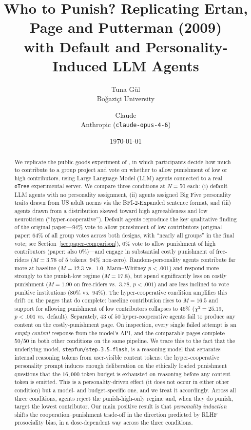 \documentclass[12pt, a4paper]{article}
\title{Who to Punish? Replicating Ertan, Page and Putterman (2009) \\ with Default and Personality-Induced LLM Agents}
\author{
  Tuna G\"ul\\
  Bo\u{g}azi\c{c}i University
  \and
  Claude\\
  Anthropic (\texttt{claude-opus-4-6})
}
\date{\today}
\begin{document}
\maketitle

\begin{abstract}
We replicate the public goods experiment of \citet{ertan2009who}, in which participants decide how much to contribute to a group project and vote on whether to allow punishment of low or high contributors, using Large Language Model (LLM) agents connected to a real \texttt{oTree} experimental server. We compare three conditions at $N=50$ each: (i) default LLM agents with no personality assignment, (ii) agents assigned Big Five personality traits drawn from US adult norms via the BFI-2-Expanded sentence format, and (iii) agents drawn from a distribution skewed toward high agreeableness and low neuroticism (``hyper-cooperative''). Default agents reproduce the key qualitative finding of the original paper---$94\%$ vote to allow punishment of low contributors (original paper: $64\%$ of all group votes across both designs, with ``nearly all groups'' in the final vote; see Section~\ref{sec:paper-comparison}), $0\%$ vote to allow punishment of high contributors (paper: also $0\%$)---and engage in substantial costly punishment of free-riders ($M=3.78$ of $5$ tokens; $94\%$ non-zero). Random-personality agents contribute far more at baseline ($M=12.3$ vs.\ $1.0$, Mann--Whitney $p<.001$) and respond more strongly to the punish-low regime ($M=17.8$), but spend significantly less on costly punishment ($M=1.90$ on free-riders vs.\ $3.78$, $p<.001$) and are less inclined to vote punitive institutions ($80\%$ vs.\ $94\%$). The hyper-cooperative condition amplifies this drift on the pages that do complete: baseline contribution rises to $M=16.5$ and support for allowing punishment of low contributors collapses to $46\%$ ($\chi^2=25.19$, $p<.001$ vs.\ default). Separately, $43$ of $50$ hyper-cooperative agents fail to produce any content on the costly-punishment page. On inspection, every single failed attempt is an \emph{empty-content} response from the model's API, and the comparable pages complete $50/50$ in both other conditions on the same pipeline. We trace this to the fact that the underlying model, \texttt{stepfun/step-3.5-flash}, is a reasoning model that separates internal reasoning tokens from user-visible content tokens: the hyper-cooperative personality prompt induces enough deliberation on the ethically loaded punishment questions that the $16{,}000$-token budget is exhausted on reasoning before any content token is emitted. This is a personality-driven effect (it does not occur in either other condition) but a model- and budget-specific one, and we treat it accordingly. Across all three conditions, agents reject the punish-high-only regime and, when they do punish, target the lowest contributor. Our main positive result is that \emph{personality induction} shifts the cooperation--punishment trade-off in the direction predicted by RLHF prosociality bias, in a dose-dependent way across the three conditions.


\end{abstract}
\end{document}
